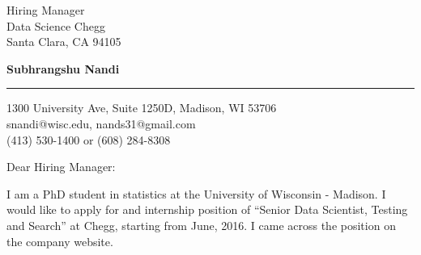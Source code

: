 \documentclass{letter} %
\begin{document}
\signature{Subhrangshu Nandi}           %
\longindentation=0pt                       %
\let\raggedleft\raggedright                %
 
 
\begin{letter}
{Hiring Manager \\
Data Science
Chegg \\
Santa Clara, CA 94105
}


\begin{flushleft}
{\bf Subhrangshu Nandi}
\end{flushleft}
\medskip\hrule height 1pt
\begin{flushright}
\hfill 1300 University Ave, Suite 1250D, Madison, WI 53706 \\
\hfill snandi@wisc.edu, nands31@gmail.com\\
\hfill (413) 530-1400 or (608) 284-8308
\end{flushright} 
\vfill %

\opening{Dear Hiring Manager:} 
 
\noindent %
I am a PhD student in statistics at the University of Wisconsin - Madison. I would like to apply for and internship position of ``Senior Data Scientist, Testing and Search'' at Chegg, starting from June, 2016. I came across the position on the company website.
 

\end{letter}
\end{document}
